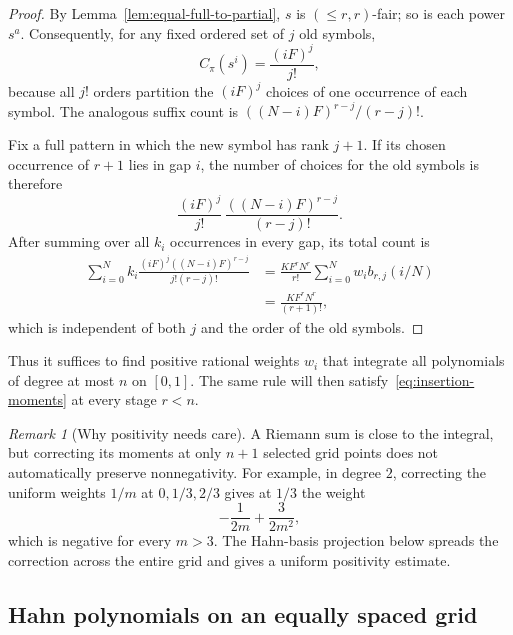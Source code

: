 \documentclass[11pt]{article}
\theoremstyle{definition}
\theoremstyle{remark}
\newtheorem{remark}[theorem]{Remark}
\begin{document}
\begin{proof}
By Lemma~\ref{lem:equal-full-to-partial}, \(s\) is
\((\leq r,r)\)-fair; so is each power \(s^a\).  Consequently, for any fixed
ordered set of \(j\) old symbols,
\[
  C_\pi(s^i)=\frac{(iF)^j}{j!},
\]
because all \(j!\) orders partition the \((iF)^j\) choices of one occurrence
of each symbol.  The analogous suffix count is
\(((N-i)F)^{r-j}/(r-j)!\).

Fix a full pattern in which the new symbol has rank \(j+1\).  If its chosen
occurrence of \(r+1\) lies in gap \(i\), the number of choices for the old
symbols is therefore
\[
  \frac{(iF)^j}{j!}\,
  \frac{((N-i)F)^{r-j}}{(r-j)!}.
\]
After summing over all \(k_i\) occurrences in every gap, its total count is
\begin{align*}
  \sum_{i=0}^N k_i
  \frac{(iF)^j((N-i)F)^{r-j}}{j!(r-j)!}
  & =\frac{KF^rN^r}{r!}
    \sum_{i=0}^N w_i b_{r,j}(i/N)\\
  & =\frac{KF^rN^r}{(r+1)!},
\end{align*}
which is independent of both \(j\) and the order of the old symbols.
\end{proof}

Thus it suffices to find positive rational weights \(w_i\) that integrate all
polynomials of degree at most \(n\) on \([0,1]\).  The same rule will then
satisfy~\eqref{eq:insertion-moments} at every stage \(r<n\).

\begin{remark}[Why positivity needs care]\label{rem:positivity-gap}
A Riemann sum is close to the integral, but correcting its moments at only
\(n+1\) selected grid points does not automatically preserve nonnegativity.
For example, in degree \(2\), correcting the uniform weights \(1/m\) at
\(0,1/3,2/3\) gives at \(1/3\) the weight
\[
  -\frac1{2m}+\frac3{2m^2},
\]
which is negative for every \(m>3\).  The Hahn-basis projection below spreads the
correction across the entire grid and gives a uniform positivity estimate.
\end{remark}

\subsection{Hahn polynomials on an equally spaced grid}
\end{document}
